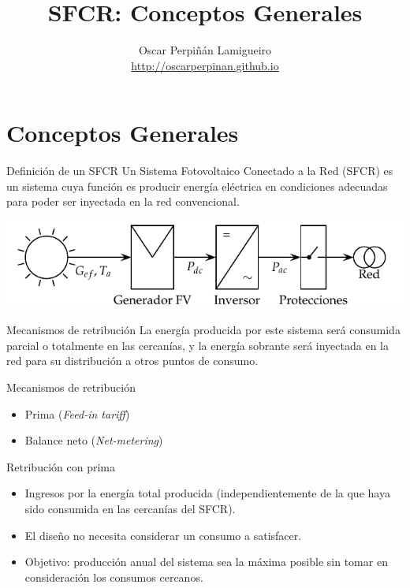 \documentclass[xcolor={usenames,svgnames,dvipsnames}]{beamer}
\author{Oscar Perpiñán Lamigueiro \\ \url{http://oscarperpinan.github.io}}
\date{}
\title{SFCR: Conceptos Generales}
\begin{document}
\maketitle

\section{Conceptos Generales}
\label{sec-1}

\begin{frame}[label=sec-1-0-1]{Definición de un SFCR}
Un Sistema Fotovoltaico Conectado a la Red (SFCR) es un sistema cuya
función es producir energía eléctrica en condiciones adecuadas para
poder ser inyectada en la red convencional.

\includegraphics[width=.9\linewidth]{../figs/EsquemaSFCR.pdf}
\end{frame}

\begin{frame}[label=sec-1-0-2]{Mecanismos de retribución}
La energía producida por este sistema será consumida parcial o
totalmente en las cercanías, y la energía sobrante será inyectada en la
red para su distribución a otros puntos de consumo.

Mecanismos de retribución

\begin{itemize}
\item Prima (\emph{Feed-in tariff})

\item Balance neto (\emph{Net-metering})
\end{itemize}
\end{frame}

\begin{frame}[label=sec-1-0-3]{Retribución con prima}
\begin{itemize}
\item Ingresos por la energía total producida (independientemente de la que
haya sido consumida en las cercanías del SFCR).

\item El diseño no necesita considerar un consumo a satisfacer.

\item Objetivo: producción anual del sistema sea la máxima posible sin
tomar en consideración los consumos cercanos.
\end{itemize}
\end{frame}
\end{document}
